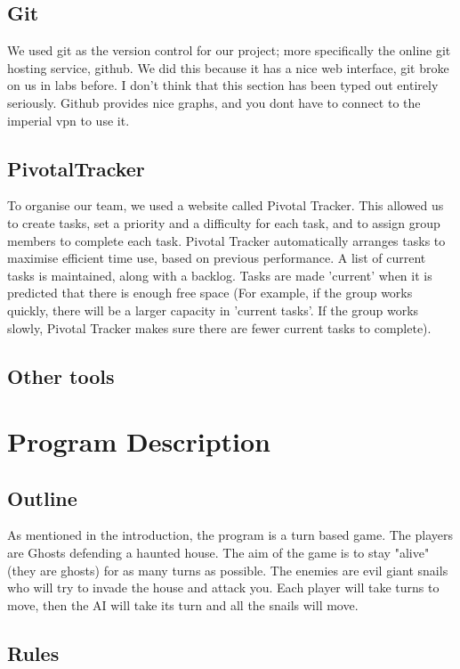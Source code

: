\documentclass{article}
\begin{document}
\subsection{Git}
We used git as the version control for our project; more specifically the online git hosting service, github. We did this because it has a nice web interface, git broke on us in labs before. I don't think that this section has been typed out entirely seriously. Github provides nice graphs, and you dont have to connect to the imperial vpn to use it.
\subsection{PivotalTracker}
To organise our team, we used a website called Pivotal Tracker. This allowed us to create tasks, set a priority and a difficulty for each task, and to assign group members to complete each task. Pivotal Tracker automatically arranges tasks to maximise efficient time use, based on previous performance. A list of current tasks is maintained, along with a backlog. Tasks are made 'current' when it is predicted that there is enough free space (For example, if the group works quickly, there will be a larger capacity in 'current tasks'. If the group works slowly, Pivotal Tracker makes sure there are fewer current tasks to complete).
\subsection{Other tools}

\section{Program Description}
\subsection{Outline}
As mentioned in the introduction, the program is a turn based game. The players are Ghosts defending a haunted house. The aim of the game is to stay "alive" (they are ghosts) for as many turns as possible. The enemies are evil giant snails who will try to invade the house and attack you. Each player will take turns to move, then the AI will take its turn and all the snails will move.
\subsection{Rules}
\end{document}
